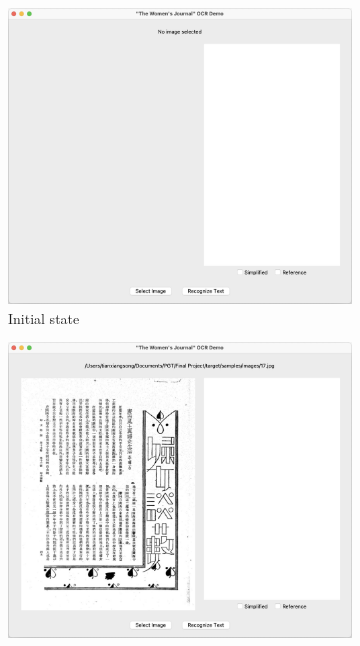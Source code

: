 \documentclass[12pt,twoside]{report}
\begin{document}
\begin{figure}[htbp]
    \centering
    \begin{subfigure}[b]{0.3\linewidth}
        \includegraphics[width=\linewidth]{./figures/ui1.1.jpeg}
        \caption{Initial state}
        \label{fig:ui1.1}
    \end{subfigure}
    \hfill
    \begin{subfigure}[b]{0.3\linewidth}
        \includegraphics[width=\linewidth]{./figures/ui1.2.jpeg}

\end{subfigure}
\end{figure}
\end{document}
